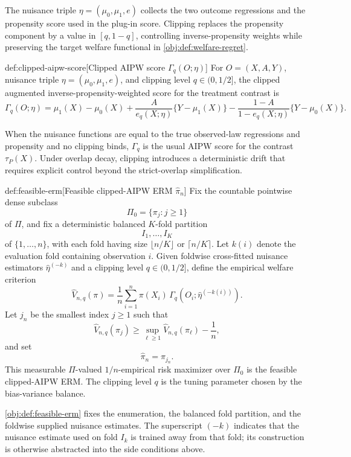 \documentclass[11pt]{article}
\begin{document}
The nuisance triple \(\eta=(\mu_0,\mu_1,e)\) collects the two outcome regressions and the propensity score used in the plug-in score.  Clipping replaces the propensity component by a value in \([q,1-q]\), controlling inverse-propensity weights while preserving the target welfare functional in \cref{obj:def:welfare-regret}.

\begin{definitionv}{def:clipped-aipw-score}[Clipped AIPW score $\Gamma_q(O;\eta)$]
For \(O=(X,A,Y)\), nuisance triple \(\eta=(\mu_0,\mu_1,e)\), and clipping level \(q\in(0,1/2]\), the clipped augmented inverse-propensity-weighted score for the treatment contrast is
\[
\Gamma_q(O;\eta)
=
\mu_1(X)-\mu_0(X)
+
\frac{A}{e_q(X;\eta)}\{Y-\mu_1(X)\}
-
\frac{1-A}{1-e_q(X;\eta)}\{Y-\mu_0(X)\}.
\]
\end{definitionv}

When the nuisance functions are equal to the true observed-law regressions and propensity and no clipping binds, \(\Gamma_q\) is the usual AIPW score for the contrast \(\tau_P(X)\).  Under overlap decay, clipping introduces a deterministic drift that requires explicit control beyond the strict-overlap simplification.

\begin{definitionv}{def:feasible-erm}[Feasible clipped-AIPW ERM $\widehat\pi_n$]
Fix the countable pointwise dense subclass
\[
\Pi_0=\{\pi_j:j\ge 1\}
\]
of \(\Pi\), and fix a deterministic balanced \(K\)-fold partition
\[
I_1,\ldots,I_K
\]
of \(\{1,\ldots,n\}\), with each fold having size \(\lfloor n/K\rfloor\) or \(\lceil n/K\rceil\). Let \(k(i)\) denote the evaluation fold containing observation \(i\). Given foldwise cross-fitted nuisance estimators \(\widehat\eta^{(-k)}\) and a clipping level \(q\in(0,1/2]\), define the empirical welfare criterion
\[
\widehat V_{n,q}(\pi)
=
\frac1n\sum_{i=1}^n
\pi(X_i)\,
\Gamma_q\!\left(O_i;\widehat\eta^{(-k(i))}\right).
\]
Let \(j_n\) be the smallest index \(j\ge1\) such that
\[
\widehat V_{n,q}(\pi_j)
\ge
\sup_{\ell\ge1}\widehat V_{n,q}(\pi_\ell)-\frac1n,
\]
and set
\[
\widehat\pi_n=\pi_{j_n}.
\]
This measurable \(\Pi\)-valued \(1/n\)-empirical risk maximizer over \(\Pi_0\) is the feasible clipped-AIPW ERM. The clipping level \(q\) is the tuning parameter chosen by the bias-variance balance.
\end{definitionv}

\cref{obj:def:feasible-erm} fixes the enumeration, the balanced fold partition, and the foldwise supplied nuisance estimates.  The superscript \((-k)\) indicates that the nuisance estimate used on fold \(I_k\) is trained away from that fold; its construction is otherwise abstracted into the side conditions above.
\end{document}
